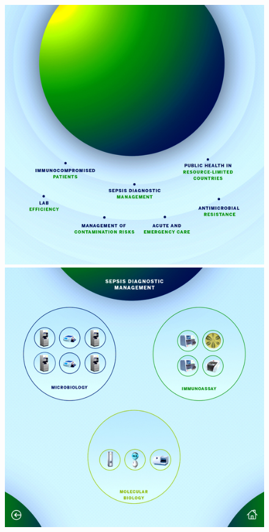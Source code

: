 \documentclass{article}
\begin{document}
\begin{figure}[h]
    \centering
    \includegraphics[scale=0.195]{resized-bmx-1-initial.jpg}
    \includegraphics[scale=0.39]{resized-bmx-2-initial.jpg}

\end{figure}
\end{document}
